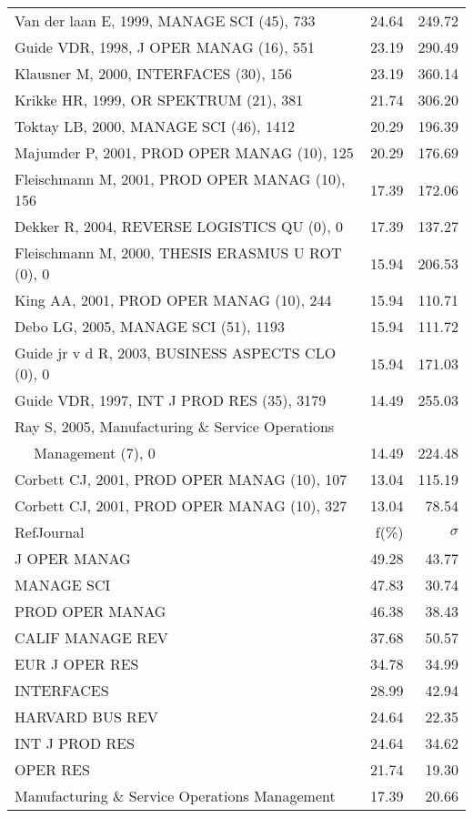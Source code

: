 \documentclass[a4paper,11pt]{report}
\begin{document}
\begin{landscape}
\begin{table}[!ht]
{\begin{tabular}{|l r r|}
Van der laan E, 1999, MANAGE SCI (45), 733 & 24.64 & 249.72\\
Guide VDR, 1998, J OPER MANAG (16), 551 & 23.19 & 290.49\\
Klausner M, 2000, INTERFACES (30), 156 & 23.19 & 360.14\\
Krikke HR, 1999, OR SPEKTRUM (21), 381 & 21.74 & 306.20\\
Toktay LB, 2000, MANAGE SCI (46), 1412 & 20.29 & 196.39\\
Majumder P, 2001, PROD OPER MANAG (10), 125 & 20.29 & 176.69\\
Fleischmann M, 2001, PROD OPER MANAG (10), 156 & 17.39 & 172.06\\
Dekker R, 2004, REVERSE LOGISTICS QU (0), 0 & 17.39 & 137.27\\
Fleischmann M, 2000, THESIS ERASMUS U ROT (0), 0 & 15.94 & 206.53\\
King AA, 2001, PROD OPER MANAG (10), 244 & 15.94 & 110.71\\
Debo LG, 2005, MANAGE SCI (51), 1193 & 15.94 & 111.72\\
Guide jr v d R, 2003, BUSINESS ASPECTS CLO (0), 0 & 15.94 & 171.03\\
Guide VDR, 1997, INT J PROD RES (35), 3179 & 14.49 & 255.03\\
Ray S, 2005, Manufacturing \& Service Operations &  & \\
$\quad$ Management (7), 0 & 14.49 & 224.48\\
Corbett CJ, 2001, PROD OPER MANAG (10), 107 & 13.04 & 115.19\\
Corbett CJ, 2001, PROD OPER MANAG (10), 327 & 13.04 & 78.54\\
\hline
\hline
RefJournal & f(\%) & $\sigma$\\
\hline
J OPER MANAG & 49.28 & 43.77\\
MANAGE SCI & 47.83 & 30.74\\
PROD OPER MANAG & 46.38 & 38.43\\
CALIF MANAGE REV & 37.68 & 50.57\\
EUR J OPER RES & 34.78 & 34.99\\
INTERFACES & 28.99 & 42.94\\
HARVARD BUS REV & 24.64 & 22.35\\
INT J PROD RES & 24.64 & 34.62\\
OPER RES & 21.74 & 19.30\\
Manufacturing \& Service Operations Management & 17.39 & 20.66\\
\hline
\end{tabular}
}
\end{table}

\end{landscape}
\end{document}
